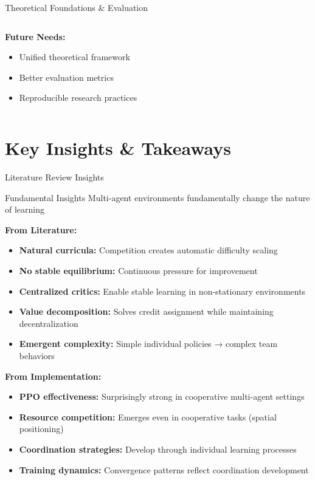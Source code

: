 \documentclass[aspectratio=169]{beamer}
\begin{document}
\begin{frame}{Theoretical Foundations \& Evaluation}
\begin{columns}
\begin{column}{0.4\textwidth}
            \vfill
            \textbf{Future Needs:}
            \begin{itemize}
                \item Unified theoretical framework
                \item Better evaluation metrics
                \item Reproducible research practices
            \end{itemize}
        \end{column}
    \end{columns}
\end{frame}

\section{Key Insights \& Takeaways}

\begin{frame}{Literature Review Insights}
    
    \begin{block}{Fundamental Insights}
        Multi-agent environments fundamentally change the nature of learning
    \end{block}
    
    \vfill
    
    \textbf{From Literature:}
    \begin{itemize}
        \item \textbf{Natural curricula:} Competition creates automatic difficulty scaling
        \item \textbf{No stable equilibrium:} Continuous pressure for improvement
        \item \textbf{Centralized critics:} Enable stable learning in non-stationary environments
        \item \textbf{Value decomposition:} Solves credit assignment while maintaining decentralization
        \item \textbf{Emergent complexity:} Simple individual policies → complex team behaviors
    \end{itemize}
    
    \vfill
    
    \textbf{From Implementation:}
    \begin{itemize}
        \item \textbf{PPO effectiveness:} Surprisingly strong in cooperative multi-agent settings
        \item \textbf{Resource competition:} Emerges even in cooperative tasks (spatial positioning)
        \item \textbf{Coordination strategies:} Develop through individual learning processes
        \item \textbf{Training dynamics:} Convergence patterns reflect coordination development
    \end{itemize}
\end{frame}
\end{document}
